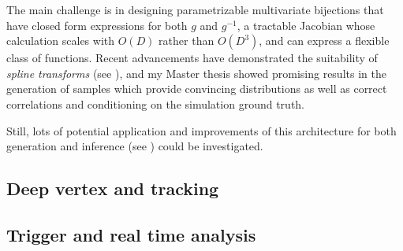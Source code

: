 \documentclass{scrartcl} %
\begin{document}
	The main challenge is in designing parametrizable multivariate bijections that have closed form expressions for both $g$ and $g^{-1}$, a tractable Jacobian whose calculation scales with $O(D)$ rather than $O(D^3)$, and can express a flexible class of functions. Recent advancements have demonstrated the suitability of \emph{spline transforms} (see \cite{durkan}), and my Master thesis showed promising results in the generation of samples which provide convincing distributions as well as correct correlations and conditioning on the simulation ground truth.
	
	Still, lots of potential application and improvements of this architecture for both generation and inference (see \cite{green2020complete}) could be investigated.

\subsection*{Deep vertex and tracking}

\subsection*{Trigger and real time analysis}
	
	
	
\end{document}
